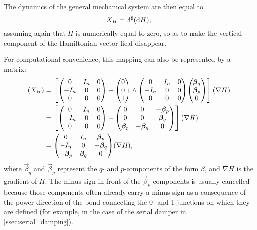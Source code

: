 The dynamics of the general mechanical system are then equal to 
\begin{equation} 
    X_H = \Lambda^\sharp(\dd{H}), 
    \label{eq:general_isomorphism}
\end{equation}
assuming again that $H$ is numerically equal to zero, so as to make the vertical component of the Hamiltonian vector field disappear. 

For computational convenience, this mapping can also be represented by a matrix: 
\begin{equation}
    \begin{split}
        (X_H) &= \qty[\mqty( 0 & I_n & 0 \\  -I_n & 0 & 0 \\ 0 & 0 & 0) 
                - \mqty(0 \\ 0 \\ 1) \wedge \mqty( 0 & I_n & 0 \\  -I_n & 0 & 0 \\ 0 & 0 & 0) \mqty(\vec{\beta}_{q} \\ \vec{\beta}_{p}\\0)](\nabla H) \\
              &= \qty[\mqty( 0 & I_n & 0 \\  -I_n & 0 & 0 \\ 0 & 0 & 0) 
                 - \mqty(0 & 0 & -\vec{\beta}_p \\ 0 & 0 & \vec{\beta}_q \\ \vec{\beta}_p &  -\vec{\beta}_q & 0 )](\nabla H) \\
              &= \mqty( 0 & I_n & \vec{\beta}_p \\  -I_n & 0 & -\vec{\beta}_q \\ -\vec{\beta}_p & \vec{\beta}_q & 0)(\nabla H),
    \end{split}
    \label{eq:matrix_jacobi_mapping}
\end{equation}
where $\vec{\beta}_q$ and $\vec{\beta}_p$ represent the $q$- and $p$-components of the form $\beta$, and $\nabla H$ is the gradient of $H$. The minus sign in front of the $\vec{\beta}_p$-components is usually cancelled because those components often already carry a minus sign as a consequence of the power direction of the bond connecting the 0- and 1-junctions on which they are defined (for example, in the case of the serial damper in \cref{ssec:serial_damping}).

